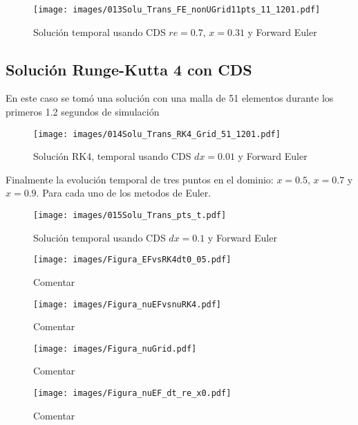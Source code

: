 \documentclass[9pt,technote,twoside,letterpaper,onecolumn]{IEEEtran}
\begin{document}
\begin{multicols}{2}
\begin{figure}[H]
  \centering
  \texttt{[image: images/013Solu\_Trans\_FE\_nonUGrid11pts\_11\_1201.pdf]}
  \caption{Solución temporal usando CDS $re=0.7$, $x=0.31$ y Forward Euler}
  \label{fig:trans_sol_non-cds_dx01}
\end{figure}

\subsection{Solución Runge-Kutta 4 con CDS}
\label{sec:sol_ucds_rk4_noncds}

En este caso se tomó una solución con una malla de 51 elementos durante los primeros 1.2 segundos de simulación
\begin{figure}[H]
  \centering
  \texttt{[image: images/014Solu\_Trans\_RK4\_Grid\_51\_1201.pdf]}
  \caption{Solución RK4, temporal usando CDS $dx=0.01$ y Forward Euler}
  \label{fig:trans_sol_rk4-cds_dx01}
\end{figure}

Finalmente la evolución temporal de tres puntos en el dominio: $x=0.5$, $x=0.7$ y $x=0.9$. Para cada uno de los metodos de Euler.
\begin{figure}[H]
  \centering
  \texttt{[image: images/015Solu\_Trans\_pts\_t.pdf]}
  \caption{Solución temporal usando CDS $dx=0.1$ y Forward Euler}
  \label{fig:trans_sol_pts_time_evol}
\end{figure}

\begin{figure*}
  \centering
  \texttt{[image: images/Figura\_EFvsRK4dt0\_05.pdf]}
  \caption{Comentar}
  \label{fig:dtvsdxuG}
\end{figure*}

\begin{figure*}
  \centering
  \texttt{[image: images/Figura\_nuEFvsnuRK4.pdf]}
  \caption{Comentar}
  \label{fig:dtvsdxnuG}
\end{figure*}

\begin{figure*}
  \centering
  \texttt{[image: images/Figura\_nuGrid.pdf]}
  \caption{Comentar}
  \label{fig:dtvsdxnuGs}
\end{figure*}

\begin{figure*}
  \centering
  \texttt{[image: images/Figura\_nuEF\_dt\_re\_x0.pdf]}
  \caption{Comentar}
  \label{fig:dtvsdxEFnuG}
\end{figure*}



\end{multicols}
\end{document}
